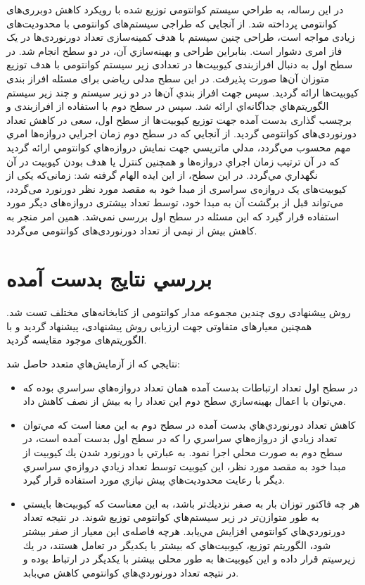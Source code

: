 در این رساله، به طراحي سیستم کوانتومی توزیع شده با رويكرد کاهش دوبرری‌های کوانتومی پرداخته شد. از آنجایی که طراجی سیستم‌های کوانتومی با محدودیت‌های زیادی مواجه است، طراحی چنین سیستم با هدف کمینه‌سازی تعداد دورنوردی‌ها در یک فاز امری دشوار است. بنابراین طراحی و بهينه‌سازي  آن، در دو سطح انجام شد. در سطح اول به دنبال افرازبندی کیوبیت‌ها در تعدادی زیر سیستم کوانتومی با هدف توزیع متوزان آن‌ها صورت پذیرفت. در این سطح مدلی ریاضی برای مسئله افراز بندی کیوبیت‌ها ارائه گردید.  سپس جهت افراز بندي آن‌ها در دو زير سيستم و چند زير سيستم الگوريتم‌هاي جداگانه‌اي ارائه شد. سپس در سطح دوم با استفاده از افرازبندی و برچسب گذاری‌ بدست آمده جهت توزيع كيوبيت‌ها از سطح اول، سعی در کاهش تعداد دورنوردی‌های کوانتومی گردید. از آنجايي كه در سطح دوم زمان اجرايي دروازه‌ها امري مهم محسوب مي‌گردد، مدلي ماتريسي جهت نمايش دروازه‌هاي كوانتومي ارائه گرديد كه در آن ترتيب زمان اجراي دروازه‌ها و همچنين كنترل يا هدف بودن كيوبيت در آن نگهداري مي‌گردد. در این سطح، از این ایده الهام گرفته شد: زمانی‌که یکی از کیوبیت‌های یک دروازه‌ی سراسری از مبدا خود به مقصد مورد نظر دورنورد می‌گردد، می‌تواند قبل از برگشت آن به مبدا خود، توسط تعداد بیشتری دروازه‌های دیگر مورد استفاده قرار گیرد که این مسئله در سطح اول بررسی نمی‌شد. همین امر منجر به کاهش بیش از نیمی از تعداد دورنوردی‌های کوانتومی می‌گردد.


 
 \section{بررسي نتايج بدست آمده}
 
 روش پیشنهادی روی چندین مجموعه مدار کوانتومی از کتابخانه‌های مختلف تست شد. همچنین معیارهای متفاوتی جهت ارزیابی روش پیشنهادی، پیشنهاد گردید و با  الگوریتم‌های موجود مقایسه گردید. 
  
نتايجي كه از آزمايش‌هاي متعدد حاصل شد:
\begin{itemize}
\item
در سطح اول تعداد ارتباطات بدست آمده همان تعداد دروازه‌هاي سراسري بوده كه مي‌توان با اعمال بهينه‌سازي سطح دوم اين تعداد را به بيش از نصف كاهش داد.
\item
كاهش تعداد دورنوردي‌هاي بدست آمده در سطح دوم به اين معنا است كه مي‌توان تعداد زيادي از دروازه‌هاي سراسري را كه در سطح اول بدست آمده است، در سطح دوم به صورت محلي اجرا نمود. به عبارتي با دورنورد شدن يك كيوبيت از مبدا خود به مقصد مورد نظر، اين كيوبيت توسط تعداد زيادي دروازه‌ي سراسري ديگر با رعايت محدوديت‌هاي پيش نيازي مورد استفاده قرار گيرد.
\item
هر چه فاكتور توزان بار به صفر نزديك‌تر باشد، به اين معناست كه كيوبيت‌ها بايستي به طور متوازن‌تر در زير سيستم‌هاي كوانتومي توزيع شوند. در نتيجه تعداد دورنوردي‌هاي كوانتومي افزايش مي‌يابد. هرچه فاصله‌ی اين معيار از صفر بيشتر شود، الگوريتم توزيع، كيوبيت‌هاي كه بيشتر با يكديگر در تعامل هستند، در يك زيرسيتم قرار داده و این کیوبیت‌ها به طور محلی بیشتر با یکدیگر در ارتباط  بوده و در نتيجه تعداد دورنوردي‌هاي كوانتومي كاهش مي‌بابد.
 
\end{itemize}
